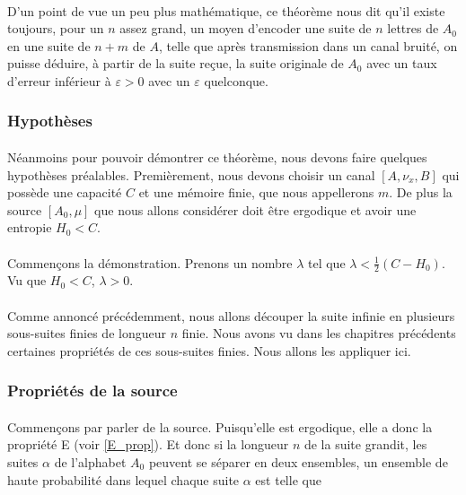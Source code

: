 	\paragraph{}
	D'un point de vue un peu plus mathématique, ce théorème nous dit
	qu'il existe toujours, pour un $n$ assez grand, un moyen d'encoder une 
	suite de $n$ lettres de $A_0$ en une suite de $n+m$ de $A$, telle
	que après transmission dans un canal bruité, on puisse déduire, 
	à partir de la suite reçue, la suite originale de $A_0$ avec un taux
	d'erreur inférieur à $\varepsilon >0$ avec un $\varepsilon$ quelconque.
	
\subsubsection*{Hypothèses}
	
	\paragraph{}
	Néanmoins pour pouvoir démontrer ce théorème, nous devons faire quelques
	hypothèses préalables. Premièrement, nous devons choisir un
	canal $[A,\nu_x,B]$ qui possède une capacité $C$ et une mémoire finie,
	que nous appellerons $m$. De plus la source $[A_0,\mu]$ que nous allons
	considérer doit être ergodique et avoir une entropie $H_0 < C$.

	\paragraph{}
	Commençons la démonstration. Prenons un nombre $\lambda$ tel que 
	$\lambda<\frac{1}{2}(C-H_0)$. Vu que $H_0 < C$, $\lambda>0$. 
	
	\paragraph{}
	Comme annoncé précédemment, nous allons découper la suite infinie
	en plusieurs sous-suites finies de longueur $n$ finie. Nous avons
	vu dans les chapitres précédents certaines propriétés de ces sous-suites
	finies. Nous allons les appliquer ici.

\subsubsection*{Propriétés de la source}
	
	\paragraph{}
	Commençons par parler de la source. Puisqu'elle est ergodique, elle a
	donc la propriété E (voir \ref{E_prop}). Et donc si la longueur $n$
	de la suite grandit, les suites $\alpha$ de l'alphabet
	$A_0$ peuvent se séparer en deux ensembles, un ensemble de haute 
	probabilité dans lequel chaque suite $\alpha$ est telle que
	
